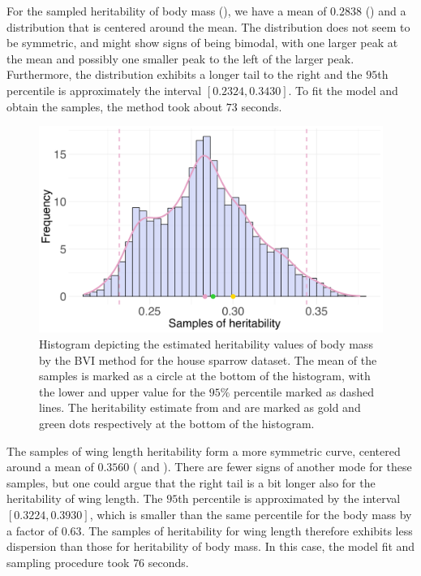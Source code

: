 \noindent For the sampled heritability of body mass (), we have a mean of $0.2838$ () and a distribution that is centered around the mean. The distribution does not seem to be symmetric, and might show signs of being bimodal, with one larger peak at the mean and possibly one smaller peak to the left of the larger peak. Furthermore, the distribution exhibits a longer tail to the right and the $95$th percentile is approximately the interval $[0.2324, 0.3430]$. To fit the model and obtain the samples, the method took about $73$ seconds.
\begin{figure}[H]
  \centering
    \includegraphics[width=1\linewidth]{Figures/House sparrow study/Heritability_mass.png}
    \caption{Histogram depicting the estimated heritability values of body mass by the BVI method for the house sparrow dataset. The mean of the samples is marked as a circle at the bottom of the histogram, with the lower and upper value for the $95\%$ percentile marked as dashed lines. The heritability estimate from \citet{Silva2017} and \citet{Muff2019Genetic} are marked as gold and green dots respectively at the bottom of the histogram.}
    \label{fig:heritability_mass}
\end{figure}
\noindent The samples of wing length heritability form a more symmetric curve, centered around a mean of $0.3560$ ( and ). There are fewer signs of another mode for these samples, but one could argue that the right tail is a bit longer also for the heritability of wing length. The $95$th percentile is approximated by the interval $[0.3224, 0.3930]$, which is smaller than the same percentile for the body mass by a factor of $0.63$. The samples of heritability for wing length therefore exhibits less dispersion than those for heritability of body mass. In this case, the model fit and sampling procedure took $76$ seconds.
